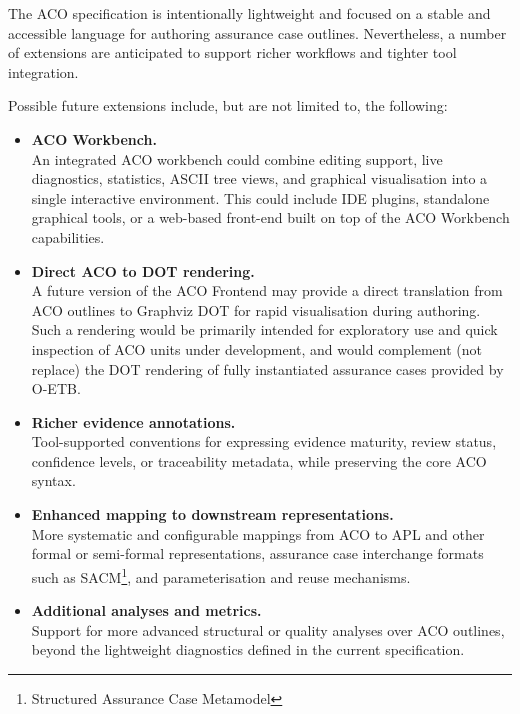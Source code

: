 \documentclass[11pt,twoside,a4paper]{article}
\begin{document}
The ACO specification is intentionally lightweight and focused on a stable
and accessible language for authoring assurance case outlines. Nevertheless, a number
of extensions are anticipated to support richer workflows and tighter tool
integration.

Possible future extensions include, but are not limited to, the following:

\begin{itemize}[leftmargin=2em]
  \item \textbf{ACO Workbench.} \\
        An integrated ACO workbench could combine editing support, live
        diagnostics, statistics, ASCII tree views, and graphical visualisation into a
        single interactive environment. This could include IDE plugins,
        standalone graphical tools, or a web-based front-end built on top of the
        ACO Workbench capabilities.

  \item \textbf{Direct ACO to DOT rendering.} \\
        A future version of the ACO Frontend may provide a direct translation
        from ACO outlines to Graphviz DOT for rapid visualisation during
        authoring. Such a rendering would be primarily intended for exploratory
        use and quick inspection of ACO units under development, and would complement (not replace) the DOT
        rendering of fully instantiated assurance cases provided by O-ETB.

  \item \textbf{Richer evidence annotations.} \\
        Tool-supported conventions for expressing evidence maturity, review
        status, confidence levels, or traceability metadata, while preserving
        the core ACO syntax.

  \item \textbf{Enhanced mapping to downstream representations.} \\
        More systematic and configurable mappings from ACO to APL and other
        formal or semi-formal representations, assurance case interchange formats such as SACM\footnote{Structured Assurance Case Metamodel}, and parameterisation and
        reuse mechanisms.

  \item \textbf{Additional analyses and metrics.} \\
        Support for more advanced structural or quality analyses over ACO
        outlines, beyond the lightweight diagnostics defined in the current
        specification.
\end{itemize}
\end{document}
